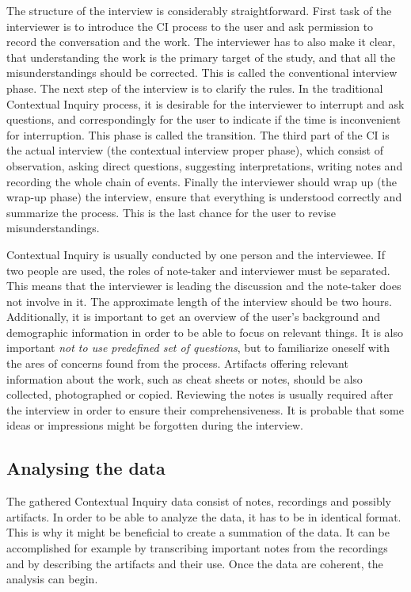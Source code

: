 \documentclass[12pt,a4paper,oneside,pdftex]{report}
\begin{document}
The structure of the interview is considerably straightforward. First task of the interviewer is to introduce the CI process to the user and ask permission to record the conversation and the work. The interviewer has to also make it clear, that understanding the work is the primary target of the study, and that all the misunderstandings should be corrected. This is called the conventional interview phase. The next step of the interview is to clarify the rules. In the traditional Contextual Inquiry process, it is desirable for the interviewer to interrupt and ask questions, and correspondingly for the user to indicate if the time is inconvenient for interruption. This phase is called the transition. The third part of the CI is the actual interview (the contextual interview proper phase), which consist of observation, asking direct questions, suggesting interpretations, writing notes and recording the whole chain of events. Finally the interviewer should wrap up (the wrap-up phase) the interview, ensure that everything is understood correctly and summarize the process. This is the last chance for the user to revise misunderstandings. \cite{RefWorks:21}

Contextual Inquiry is usually conducted by one person and the interviewee. If two people are used, the roles of note-taker and interviewer must be separated. This means that the interviewer is leading the discussion and the note-taker does not involve in it. The approximate length of the interview should be two hours. Additionally, it is important to get an overview of the user's background and demographic information in order to be able to focus on relevant things. It is also important \emph{not to use predefined set of questions}, but to familiarize oneself with the ares of concerns found from the process. Artifacts offering relevant information about the work, such as cheat sheets or notes, should be also collected, photographed or copied. \cite{RefWorks:27} Reviewing the notes is usually required after the interview in order to ensure their comprehensiveness. It is probable that some ideas or impressions might be forgotten during the interview. \cite{RefWorks:28}


\subsection{Analysing the data}

The gathered Contextual Inquiry data consist of notes, recordings and possibly artifacts. In order to be able to analyze the data, it has to be in identical format. This is why it might be beneficial to create a summation of the data. It can be accomplished for example by transcribing important notes from the recordings and by describing the artifacts and their use. Once the data are coherent, the analysis can begin. 
\end{document}
